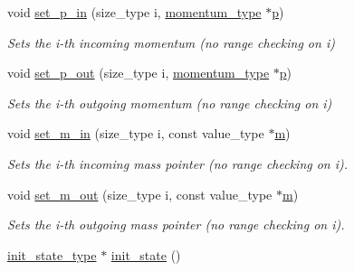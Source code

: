 \begin{DoxyCompactItemize}
\item 
\hypertarget{a00441_a45c1e9624f89e3d61d9559a7f415ad02}{void \hyperlink{a00441_a45c1e9624f89e3d61d9559a7f415ad02}{set\-\_\-p\-\_\-in} (size\-\_\-type i, \hyperlink{a00559}{momentum\-\_\-type} $\ast$\hyperlink{a00441_ac25aaa44a2bde95d582aac52f85fdfdf}{p})}\label{a00441_a45c1e9624f89e3d61d9559a7f415ad02}

\begin{DoxyCompactList}\small\item\em Sets the i-\/th incoming momentum (no range checking on i) \end{DoxyCompactList}\item 
\hypertarget{a00441_a492347db4ed4e67d34bd0f06f3f0b516}{void \hyperlink{a00441_a492347db4ed4e67d34bd0f06f3f0b516}{set\-\_\-p\-\_\-out} (size\-\_\-type i, \hyperlink{a00559}{momentum\-\_\-type} $\ast$\hyperlink{a00441_ac25aaa44a2bde95d582aac52f85fdfdf}{p})}\label{a00441_a492347db4ed4e67d34bd0f06f3f0b516}

\begin{DoxyCompactList}\small\item\em Sets the i-\/th outgoing momentum (no range checking on i) \end{DoxyCompactList}\item 
\hypertarget{a00441_ab780bbfe111a895c3ce8d39838b0f937}{void \hyperlink{a00441_ab780bbfe111a895c3ce8d39838b0f937}{set\-\_\-m\-\_\-in} (size\-\_\-type i, const value\-\_\-type $\ast$\hyperlink{a00442_a3a9390d5b0f36b7778161963c43843b0}{m})}\label{a00441_ab780bbfe111a895c3ce8d39838b0f937}

\begin{DoxyCompactList}\small\item\em Sets the i-\/th incoming mass pointer (no range checking on i). \end{DoxyCompactList}\item 
\hypertarget{a00441_ae04f7eebaa9e1423f234ee12aeef49bd}{void \hyperlink{a00441_ae04f7eebaa9e1423f234ee12aeef49bd}{set\-\_\-m\-\_\-out} (size\-\_\-type i, const value\-\_\-type $\ast$\hyperlink{a00442_a3a9390d5b0f36b7778161963c43843b0}{m})}\label{a00441_ae04f7eebaa9e1423f234ee12aeef49bd}

\begin{DoxyCompactList}\small\item\em Sets the i-\/th outgoing mass pointer (no range checking on i). \end{DoxyCompactList}\item 
\hypertarget{a00441_a2747dd61ee5bf952f42f5629fa9b3960}{\hyperlink{a00304}{init\-\_\-state\-\_\-type} $\ast$ \hyperlink{a00441_a2747dd61ee5bf952f42f5629fa9b3960}{init\-\_\-state} ()}\label{a00441_a2747dd61ee5bf952f42f5629fa9b3960}


\end{DoxyCompactItemize}
